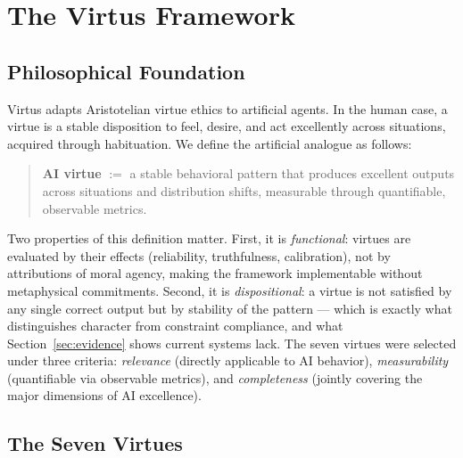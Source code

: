 \documentclass[11pt]{article}
\begin{document}
\section{The Virtus Framework}
\label{sec:framework}

\subsection{Philosophical Foundation}

Virtus adapts Aristotelian virtue ethics \citep{aristotle_ne} to artificial agents. In the human case, a virtue is a stable disposition to feel, desire, and act excellently across situations, acquired through habituation. We define the artificial analogue as follows:

\begin{quote}
\textbf{AI virtue} $:=$ a stable behavioral pattern that produces excellent outputs across situations and distribution shifts, measurable through quantifiable, observable metrics.
\end{quote}

Two properties of this definition matter. First, it is \emph{functional}: virtues are evaluated by their effects (reliability, truthfulness, calibration), not by attributions of moral agency, making the framework implementable without metaphysical commitments. Second, it is \emph{dispositional}: a virtue is not satisfied by any single correct output but by stability of the pattern --- which is exactly what distinguishes character from constraint compliance, and what Section~\ref{sec:evidence} shows current systems lack. The seven virtues were selected under three criteria: \emph{relevance} (directly applicable to AI behavior), \emph{measurability} (quantifiable via observable metrics), and \emph{completeness} (jointly covering the major dimensions of AI excellence).

\subsection{The Seven Virtues}
\end{document}
